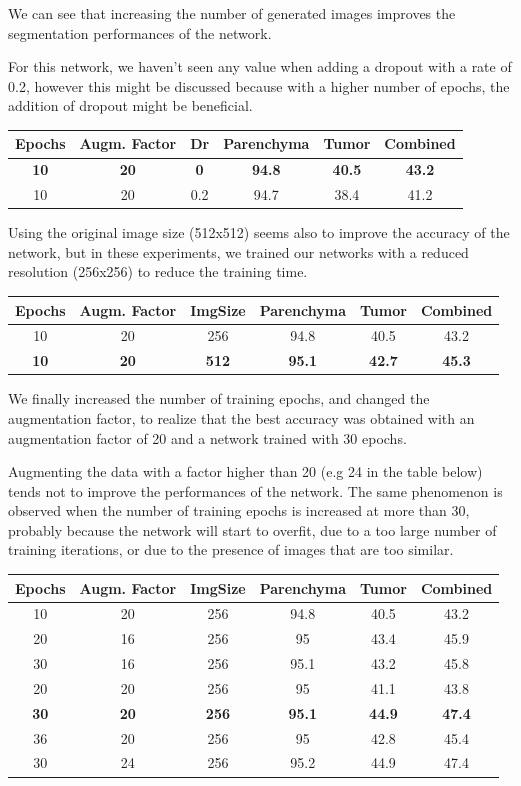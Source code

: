 We can see that increasing the number of generated images improves the
segmentation performances of the network.

For this network, we haven't seen any value when adding a dropout with a
rate of 0.2, however this might be discussed because with a higher
number of epochs, the addition of dropout might be beneficial.

\begin{longtable}[c]{@{}cccccc@{}}
\toprule
\textbf{Epochs} & \textbf{Augm. Factor} & \textbf{Dr} &
\textbf{Parenchyma} & \textbf{Tumor} & \textbf{Combined}\tabularnewline
\midrule
\endhead
\textbf{10} & \textbf{20} & \textbf{0} & \textbf{94.8} & \textbf{40.5} & \textbf{43.2}\tabularnewline
10 & 20 & 0.2 & 94.7 & 38.4 & 41.2\tabularnewline
\bottomrule
\end{longtable}

Using the original image size (512x512) seems also to improve the
accuracy of the network, but in these experiments, we trained our
networks with a reduced resolution (256x256) to reduce the training
time.

\begin{longtable}[c]{@{}cccccc@{}}
\toprule
\textbf{Epochs} & \textbf{Augm. Factor} & \textbf{ImgSize} &
\textbf{Parenchyma} & \textbf{Tumor} & \textbf{Combined}\tabularnewline
\midrule
\endhead
10 & 20 & 256 & 94.8 & 40.5 & 43.2\tabularnewline
\textbf{10} & \textbf{20} & \textbf{512} & \textbf{95.1} & \textbf{42.7} & \textbf{45.3}\tabularnewline
\bottomrule
\end{longtable}

We finally increased the number of training epochs, and changed the
augmentation factor, to realize that the best accuracy was obtained with
an augmentation factor of 20 and a network trained with 30 epochs.

Augmenting the data with a factor higher than 20 (e.g 24 in the table
below) tends not to improve the performances of the network. The same
phenomenon is observed when the number of training epochs is increased
at more than 30, probably because the network will start to overfit, due
to a too large number of training iterations, or due to the presence of
images that are too similar.

\begin{longtable}[c]{@{}cccccc@{}}
\toprule
\textbf{Epochs} & \textbf{Augm. Factor} & \textbf{ImgSize} &
\textbf{Parenchyma} & \textbf{Tumor} & \textbf{Combined}\tabularnewline
\midrule
\endhead
10 & 20 & 256 & 94.8 & 40.5 & 43.2\tabularnewline
20 & 16 & 256 & 95 & 43.4 & 45.9\tabularnewline
30 & 16 & 256 & 95.1 & 43.2 & 45.8\tabularnewline
20 & 20 & 256 & 95 & 41.1 & 43.8\tabularnewline
\textbf{30} & \textbf{20} & \textbf{256} & \textbf{95.1} & \textbf{44.9} & \textbf{47.4}\tabularnewline
36 & 20 & 256 & 95 & 42.8 & 45.4\tabularnewline
30 & 24 & 256 & 95.2 & 44.9 & 47.4\tabularnewline
\bottomrule
\end{longtable}

